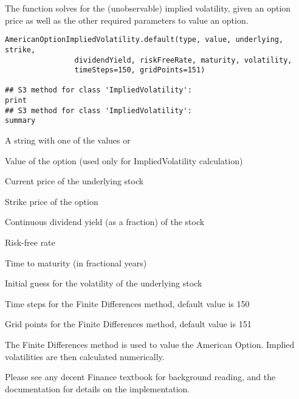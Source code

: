 \begin{Description}\relax
The  function solves for the
(unobservable) implied volatility, given an option price as well as
the other required parameters to value an option.
\end{Description}
\begin{Usage}
\begin{verbatim}
AmericanOptionImpliedVolatility.default(type, value, underlying, strike,
                dividendYield, riskFreeRate, maturity, volatility,
                timeSteps=150, gridPoints=151)

## S3 method for class 'ImpliedVolatility':
print
## S3 method for class 'ImpliedVolatility':
summary
\end{verbatim}
\end{Usage}
\begin{Arguments}
\begin{ldescription}
\item[\code{type}] A string with one of the values  or 
\item[\code{value}] Value of the option (used only for ImpliedVolatility calculation)
\item[\code{underlying}] Current price of the underlying stock
\item[\code{strike}] Strike price of the option
\item[\code{dividendYield}] Continuous dividend yield (as a fraction) of the stock
\item[\code{riskFreeRate}] Risk-free rate
\item[\code{maturity}] Time to maturity (in fractional years)
\item[\code{volatility}] Initial guess for the volatility of the underlying
stock
\item[\code{timeSteps}] Time steps for the Finite Differences method, default
value is 150
\item[\code{gridPoints}] Grid points for the Finite Differences method,
default value is 151
\end{ldescription}
\end{Arguments}
\begin{Details}\relax
The Finite Differences method is used to value the American Option.
Implied volatilities are then calculated numerically.

Please see any decent Finance textbook for background reading, and the
 documentation for details on the 
implementation.
\end{Details}
